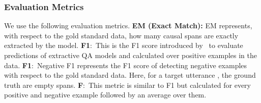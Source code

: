 \documentclass[smallextended]{svjour3}
\newcommand\0{\hphantom{0}}
\begin{document}
\subsubsection{Evaluation Metrics}
\label{sec:metric}


We use the following evaluation metrics.
\textbf{EM (Exact Match):} EM represents, with respect to the gold standard data, how many causal spans are exactly extracted by the model.
\textbf{F1}:~This is the F1 score introduced by~\citet{rajpurkar2016squad} to evaluate predictions of extractive QA models and calculated over positive examples in the data.
\textbf{F1}:~Negative F1 represents the F1 score of detecting negative examples with respect to the gold standard data. Here, for a target utterance , the ground truth are empty spans.
\textbf{F}:~This metric is similar to F1 but calculated for every positive and negative example followed by an average over them.
\end{document}
